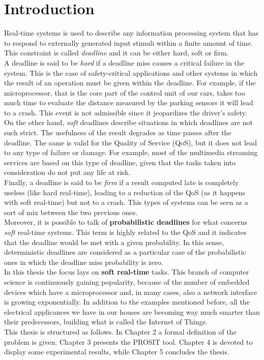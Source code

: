 \chapter{Introduction}\label{chp:introduction}


Real-time systems \cite{hardrealtime} is used to describe any information processing system that has to respond to externally generated input stimuli within a finite amount of time. This constraint is called \emph{deadline} and it can be either hard, soft or firm.\\
A deadline is said to be \emph{hard} if a deadline miss causes a critical failure in the system. This is the case of safety-critical applications and other systems in which the result of an operation must be given within the deadline. For example, if the microprocessor, that is the core part of the control unit of our cars, takes too much time to evaluate the distance measured by the parking sensors it will lead to a crash. This event is not admissible since it jeopardizes the driver's safety.\\
On the other hand, \emph{soft} deadlines describe situations in which deadlines are not such strict. The usefulness of the result degrades as time passes after the deadline. The same is valid for the Quality of Service (QoS), but it does not lead to any type of failure or damage. For example, most of the multimedia streaming services are based on this type of deadline, given that the tasks taken into consideration do not put any life at risk.\\
Finally, a deadline is said to be \emph{firm} if a result computed late is completely useless (like hard real-time), leading to a reduction of the QoS (as it happens with soft real-time) but not to a crash. This types of systems can be seen as a sort of mix between the two previous ones.\\
Moreover, it is possible to talk of \textbf{probabilistic deadlines} \cite{abeni} for what concerns \emph{soft} real-time systems. This term is highly related to the QoS and it indicates that the deadline would be met with a given probability. In this sense, deterministic deadlines are considered as a particular case of the probabilistic ones in which the deadline miss probability is zero.\\ 
In this thesis the focus lays on \textbf{soft real-time} tasks. This branch of computer science is continuously gaining popularity, because of the number of embedded devices which have a microprocessor and, in many cases, also a network interface is growing exponentially. In addition to the examples mentioned before, all the electrical applicances we have in our houses are becoming way much smarter than their predecessors, building what is called the Internet of Things.\\
This thesis is structured as follows. In Chapter 2 a formal definition of the problem is given. Chapter 3 presents the PROSIT tool. Chapter 4 is devoted to display some experimental results, while Chapter 5 concludes the thesis.      